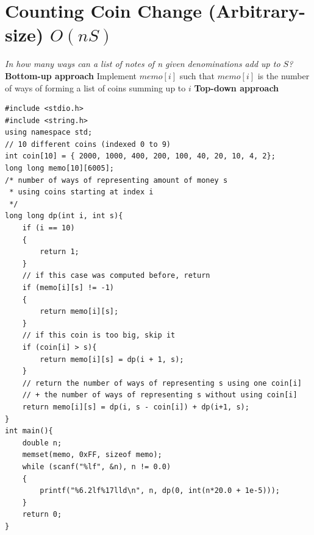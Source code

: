 \documentclass[12pt]{book}
\begin{document}
\section{Counting Coin Change (Arbitrary-size) $O(nS)$}
\textit{In how many ways can a list of notes of n given denominations add up to $S$?}
\textbf{Bottom-up approach}
Implement $memo[i]$ such that $memo[i]$ is the number of ways of forming a list of coins summing up to $i$
\textbf{Top-down approach}
\begin{verbatim}
#include <stdio.h>
#include <string.h>
using namespace std;
// 10 different coins (indexed 0 to 9)
int coin[10] = { 2000, 1000, 400, 200, 100, 40, 20, 10, 4, 2};
long long memo[10][6005];
/* number of ways of representing amount of money s
 * using coins starting at index i
 */
long long dp(int i, int s){
	if (i == 10)
	{
		return 1;
	}
	// if this case was computed before, return
	if (memo[i][s] != -1)
	{
		return memo[i][s];
	}
	// if this coin is too big, skip it
	if (coin[i] > s){
		return memo[i][s] = dp(i + 1, s);
	}
	// return the number of ways of representing s using one coin[i]
	// + the number of ways of representing s without using coin[i]
	return memo[i][s] = dp(i, s - coin[i]) + dp(i+1, s);
}
int main(){
	double n;
	memset(memo, 0xFF, sizeof memo);
	while (scanf("%lf", &n), n != 0.0)
	{
		printf("%6.2lf%17lld\n", n, dp(0, int(n*20.0 + 1e-5)));
	}
	return 0;
}
\end{verbatim}
\end{document}
